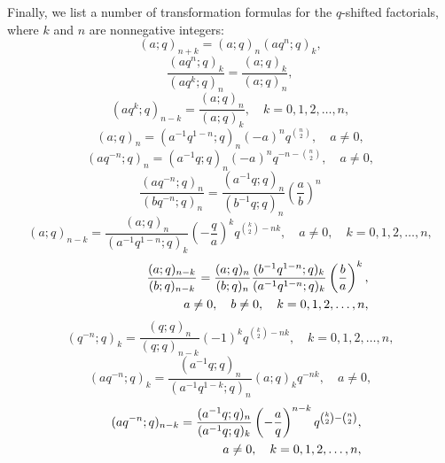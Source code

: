 \documentclass[envcountchap,graybox]{svmono}
\newcommand{\mathindent}{\hspace{7.5mm}}
\begin{document}
Finally, we list a number of transformation formulas for the $q$-shifted
factorials, where $k$ and $n$ are nonnegative integers:
\begin{equation}
\label{qsh6}
(a;q)_{n+k}=(a;q)_n(aq^n;q)_k,
\end{equation}
\begin{equation}
\label{qsh7}
\frac{(aq^n;q)_k}{(aq^k;q)_n}=\frac{(a;q)_k}{(a;q)_n},
\end{equation}
\begin{equation}
\label{qsh8}
(aq^k;q)_{n-k}=\frac{(a;q)_n}{(a;q)_k},\quad k=0,1,2,\ldots,n,
\end{equation}
\begin{equation}
\label{qsh9}
(a;q)_n=(a^{-1}q^{1-n};q)_n(-a)^nq^{\binom{n}{2}},\quad a\neq 0,
\end{equation}
\begin{equation}
\label{qsh10}
(aq^{-n};q)_n=(a^{-1}q;q)_n(-a)^nq^{-n-\binom{n}{2}},\quad a\neq 0,
\end{equation}
\begin{equation}
\label{qsh11}
\frac{(aq^{-n};q)_n}{(bq^{-n};q)_n}=\frac{(a^{-1}q;q)_n}{(b^{-1}q;q)_n}
\left(\frac{a}{b}\right)^n
\end{equation}
\begin{equation}
\label{qsh12}
(a;q)_{n-k}=\frac{(a;q)_n}{(a^{-1}q^{1-n};q)_k}\left(-\frac{q}{a}\right)^k
q^{\binom{k}{2}-nk},\quad a\neq 0,\quad k=0,1,2,\ldots,n,
\end{equation}
\begin{eqnarray}
\label{qsh13}
& &\frac{(a;q)_{n-k}}{(b;q)_{n-k}}=\frac{(a;q)_n}{(b;q)_n}
\frac{(b^{-1}q^{1-n};q)_k}{(a^{-1}q^{1-n};q)_k}\left(\frac{b}{a}\right)^k,\nonumber\\
& &{}\mathindent\mathindent\mathindent a\neq 0,\quad b\neq 0,\quad k=0,1,2,\ldots,n,
\end{eqnarray}
\begin{equation}
\label{qsh14}
(q^{-n};q)_k=\frac{(q;q)_n}{(q;q)_{n-k}}(-1)^kq^{\binom{k}{2}-nk},
\quad k=0,1,2,\ldots,n,
\end{equation}
\begin{equation}
\label{qsh15}
(aq^{-n};q)_k=\frac{(a^{-1}q;q)_n}{(a^{-1}q^{1-k};q)_n}(a;q)_kq^{-nk},
\quad a\neq 0,
\end{equation}
\begin{eqnarray}
\label{qsh16}
& &(aq^{-n};q)_{n-k}=\frac{(a^{-1}q;q)_n}{(a^{-1}q;q)_k}
\left(-\frac{a}{q}\right)^{n-k}q^{\binom{k}{2}-\binom{n}{2}},\nonumber\\
& &{}\mathindent\mathindent\mathindent a\neq 0,\quad k=0,1,2,\ldots,n,
\end{eqnarray}
\end{document}
